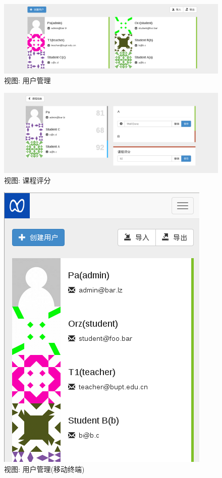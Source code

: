\begin{figure}[!h]
  \begin{center}
    \includegraphics[scale=0.3]{figures/screenshot/userman.png}
    \caption{视图: 用户管理\label{SSUserMgr}}
  \end{center}
\end{figure}

\begin{figure}[!h]
  \begin{center}
    \includegraphics[scale=0.3]{figures/screenshot/review.png}
    \caption{视图: 课程评分\label{SSCourseReview}}
  \end{center}
\end{figure}

\begin{figure}[!h]
  \begin{center}
    \includegraphics[scale=0.5]{figures/screenshot/responsive.png}
    \caption{视图: 用户管理(移动终端)\label{SSResponsive}}
  \end{center}
\end{figure}

